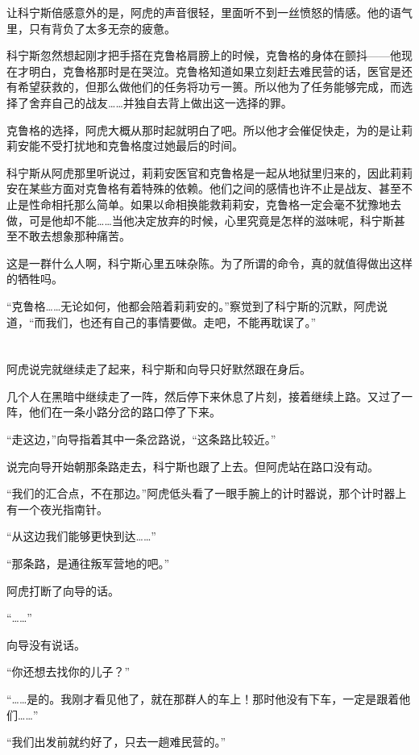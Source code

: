 让科宁斯倍感意外的是，阿虎的声音很轻，里面听不到一丝愤怒的情感。他的语气里，只有背负了太多无奈的疲惫。

科宁斯忽然想起刚才把手搭在克鲁格肩膀上的时候，克鲁格的身体在颤抖——他现在才明白，克鲁格那时是在哭泣。克鲁格知道如果立刻赶去难民营的话，医官是还有希望获救的，但那么做他们的任务将功亏一篑。所以他为了任务能够完成，而选择了舍弃自己的战友……并独自去背上做出这一选择的罪。

克鲁格的选择，阿虎大概从那时起就明白了吧。所以他才会催促快走，为的是让莉莉安能不受打扰地和克鲁格度过她最后的时间。

科宁斯从阿虎那里听说过，莉莉安医官和克鲁格是一起从地狱里归来的，因此莉莉安在某些方面对克鲁格有着特殊的依赖。他们之间的感情也许不止是战友、甚至不止是性命相托那么简单。如果以命相换能救莉莉安，克鲁格一定会毫不犹豫地去做，可是他却不能……当他决定放弃的时候，心里究竟是怎样的滋味呢，科宁斯甚至不敢去想象那种痛苦。

这是一群什么人啊，科宁斯心里五味杂陈。为了所谓的命令，真的就值得做出这样的牺牲吗。

“克鲁格……无论如何，他都会陪着莉莉安的。”察觉到了科宁斯的沉默，阿虎说道，“而我们，也还有自己的事情要做。走吧，不能再耽误了。”



\section*{}

阿虎说完就继续走了起来，科宁斯和向导只好默然跟在身后。

几个人在黑暗中继续走了一阵，然后停下来休息了片刻，接着继续上路。又过了一阵，他们在一条小路分岔的路口停了下来。

“走这边，”向导指着其中一条岔路说，“这条路比较近。”

说完向导开始朝那条路走去，科宁斯也跟了上去。但阿虎站在路口没有动。

“我们的汇合点，不在那边。”阿虎低头看了一眼手腕上的计时器说，那个计时器上有一个夜光指南针。

“从这边我们能够更快到达……”

“那条路，是通往叛军营地的吧。”

阿虎打断了向导的话。

“……”

向导没有说话。

“你还想去找你的儿子？”

“……是的。我刚才看见他了，就在那群人的车上！那时他没有下车，一定是跟着他们……”

“我们出发前就约好了，只去一趟难民营的。”

